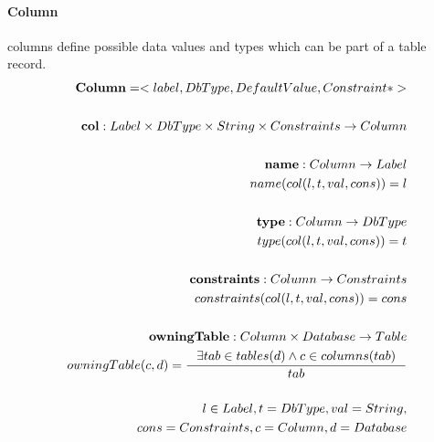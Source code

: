 \documentclass[11pt]{article}
\begin{document}
\paragraph{Column} columns define possible data values and types which can be part of a table record.
\begin{align*}
	\mathbf{Column} = <label, DbType, DefaultValue, Constraint*> \\ \\
	\mathbf{col} : Label \times DbType \times String \times Constraints \rightarrow Column \\ \\
	\mathbf{name} : Column \rightarrow Label  \\
	name(col(l, t, val, cons)) = l  \\ \\
	\mathbf{type} : Column \rightarrow DbType  \\
	type(col(l, t, val, cons)) = t  \\ \\
	\mathbf{constraints} : Column \rightarrow Constraints  \\
	constraints(col(l, t, val, cons)) = cons  \\ \\
	\mathbf{owningTable} : Column \times Database \rightarrow Table  \\
	owningTable(c, d) = \inference{\exists tab \in tables(d) \wedge c \in columns(tab)}{tab} \\ \\
l \in Label, t = DbType, val = String,\\ cons = Constraints, c = Column, d = Database
\end{align*}
\end{document}
